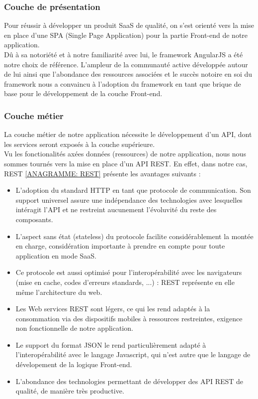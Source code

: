\begin{spacing}{1.5}
\subsubsection*{Couche de présentation}%
Pour réussir à développer un produit SaaS de qualité, on s'est orienté vers la mise en place d'une SPA (Single Page Application) pour la partie Front-end de notre application.\\

Dû à sa notoriété et à notre familiarité avec lui, le framework AngularJS a été notre choix de référence. L'ampleur de la communauté active développée autour de lui ainsi que l'abondance des ressources associées et le succès notoire en soi du framework nous a convaincu à l'adoption du framework en tant que brique de base pour le développement de la couche Front-end.

\subsubsection*{Couche métier}%
La couche métier de notre application nécessite le développement d'un API, dont les services seront exposés à la couche supérieure.\\
Vu les fonctionalités axées données (ressources) de notre application, nous nous sommes tournés vers la mise en place d'un API REST. En effet, dans notre cas, REST \ref{ANAGRAMME: REST} présente les avantages suivants :
\begin{itemize}
    \item L'adoption du standard HTTP en tant que protocole de communication. Son support universel assure une indépendance des technologies avec lesquelles intéragit l'API et ne restreint aucunement l'évoluvité du reste des composants.
    \item L'aspect sans état (stateless) du protocole facilite considérablement la montée en charge, considération importante à prendre en compte pour toute application en mode SaaS.
    \item Ce protocole est aussi optimisé pour l'interopérabilité avec les navigateurs (mise en cache, codes d'erreurs standards, ...) : REST représente en elle même l'architecture du web.
    \item Les Web services REST sont légers, ce qui les rend adaptés à la consommation via des dispositifs mobiles à ressources restreintes, exigence non fonctionnelle de notre application.
    \item Le support du format JSON le rend particulièrement adapté à l'interopérabilité avec le langage Javascript, qui n'est autre que le langage de dévelopement de la logique Front-end.
    \item L'abondance des technologies permettant de développer des API REST de qualité, de manière très productive.
\end{itemize}
\


\end{spacing}
